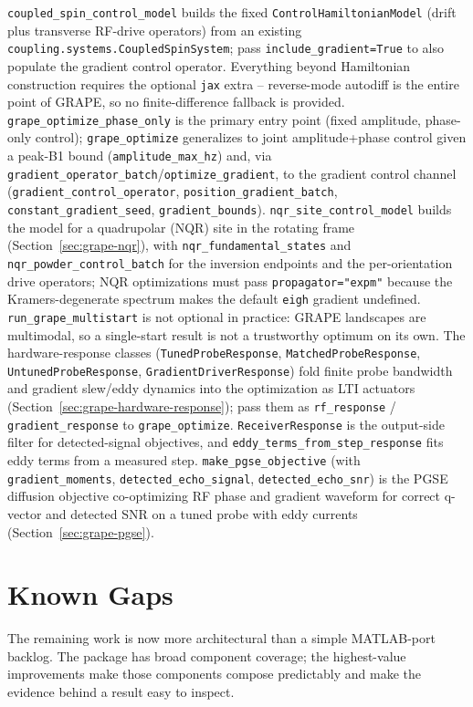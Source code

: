 \documentclass[11pt,oneside]{report}
\newcommand{\code}[1]{\texttt{#1}}
\begin{document}
\code{coupled\_spin\_control\_model} builds the fixed
\code{ControlHamiltonianModel} (drift plus transverse RF-drive operators)
from an existing \code{coupling.systems.CoupledSpinSystem}; pass
\code{include\_gradient=True} to also populate the gradient control operator.
Everything beyond Hamiltonian construction requires the optional \code{jax}
extra -- reverse-mode autodiff is the entire point of GRAPE, so no
finite-difference fallback is provided. \code{grape\_optimize\_phase\_only} is
the primary entry point (fixed amplitude, phase-only control);
\code{grape\_optimize} generalizes to joint amplitude+phase control given a
peak-B1 bound (\code{amplitude\_max\_hz}) and, via
\code{gradient\_operator\_batch}/\code{optimize\_gradient}, to the gradient
control channel (\code{gradient\_control\_operator},
\code{position\_gradient\_batch}, \code{constant\_gradient\_seed},
\code{gradient\_bounds}). \code{nqr\_site\_control\_model} builds the model for a
quadrupolar (NQR) site in the rotating frame (Section~\ref{sec:grape-nqr}), with
\code{nqr\_fundamental\_states} and \code{nqr\_powder\_control\_batch} for the
inversion endpoints and the per-orientation drive operators; NQR optimizations
must pass \code{propagator="expm"} because the Kramers-degenerate spectrum makes
the default \code{eigh} gradient undefined. \code{run\_grape\_multistart} is not
optional in practice: GRAPE landscapes are multimodal, so a single-start result
is not a trustworthy optimum on its own. The hardware-response classes
(\code{TunedProbeResponse}, \code{MatchedProbeResponse},
\code{UntunedProbeResponse}, \code{GradientDriverResponse}) fold finite probe
bandwidth and gradient slew/eddy dynamics into the optimization as LTI actuators
(Section~\ref{sec:grape-hardware-response}); pass them as \code{rf\_response} /
\code{gradient\_response} to \code{grape\_optimize}. \code{ReceiverResponse} is
the output-side filter for detected-signal objectives, and
\code{eddy\_terms\_from\_step\_response} fits eddy terms from a measured step.
\code{make\_pgse\_objective} (with \code{gradient\_moments},
\code{detected\_echo\_signal}, \code{detected\_echo\_snr}) is the PGSE diffusion
objective co-optimizing RF phase and gradient waveform for correct q-vector and
detected SNR on a tuned probe with eddy currents (Section~\ref{sec:grape-pgse}).

\chapter{Known Gaps}

The remaining work is now more architectural than a simple MATLAB-port backlog.
The package has broad component coverage; the highest-value improvements make
those components compose predictably and make the evidence behind a result easy
to inspect.
\end{document}
